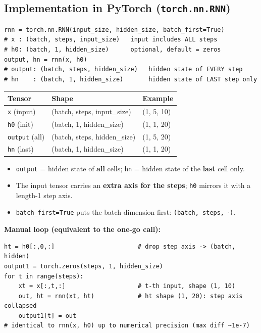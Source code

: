 \documentclass[10pt,a4paper]{article}
\begin{document}
	
	\subsection{Implementation in PyTorch (\texttt{torch.nn.RNN})}

\begin{verbatim}
rnn = torch.nn.RNN(input_size, hidden_size, batch_first=True)
# x : (batch, steps, input_size)   input includes ALL steps
# h0: (batch, 1, hidden_size)      optional, default = zeros
output, hn = rnn(x, h0)
# output: (batch, steps, hidden_size)   hidden state of EVERY step
# hn    : (batch, 1, hidden_size)       hidden state of LAST step only
\end{verbatim}

	\begin{center}
		\begin{tabular}{lll}
			\toprule
			Tensor & Shape & Example \\
			\midrule
			\texttt{x} (input) & (batch, steps, input\_size) & (1, 5, 10) \\
			\texttt{h0} (init) & (batch, 1, hidden\_size) & (1, 1, 20) \\
			\texttt{output} (all) & (batch, steps, hidden\_size) & (1, 5, 20) \\
			\texttt{hn} (last) & (batch, 1, hidden\_size) & (1, 1, 20) \\
			\bottomrule
		\end{tabular}
	\end{center}

	\begin{importantbox}
		\begin{itemize}[leftmargin=*]
			\item \texttt{output} = hidden state of \textbf{all} cells; \texttt{hn} = hidden state of the \textbf{last} cell only.
			\item The input tensor carries an \textbf{extra axis for the steps}; \texttt{h0} mirrors it with a length-1 step axis.
			\item \texttt{batch\_first=True} puts the batch dimension first: \texttt{(batch, steps, $\cdot$)}.
		\end{itemize}
	\end{importantbox}

	\textbf{Manual loop (equivalent to the one-go call):}

\begin{verbatim}
ht = h0[:,0,:]                       # drop step axis -> (batch, hidden)
output1 = torch.zeros(steps, 1, hidden_size)
for t in range(steps):
    xt = x[:,t,:]                    # t-th input, shape (1, 10)
    out, ht = rnn(xt, ht)            # ht shape (1, 20): step axis collapsed
    output1[t] = out
# identical to rnn(x, h0) up to numerical precision (max diff ~1e-7)
\end{verbatim}
\end{document}
